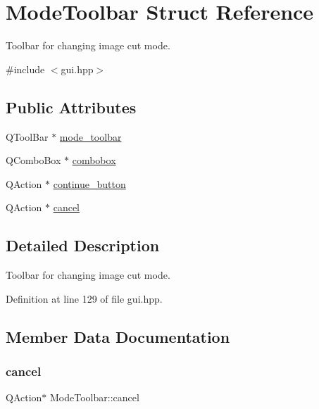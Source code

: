 \hypertarget{structModeToolbar}{}\section{Mode\+Toolbar Struct Reference}
\label{structModeToolbar}


Toolbar for changing image cut mode.  




{\ttfamily \#include $<$gui.\+hpp$>$}

\subsection*{Public Attributes}
\begin{DoxyCompactItemize}
\item 
Q\+Tool\+Bar $\ast$ \mbox{\hyperlink{structModeToolbar_acc6bcdd91825343f34ec38d312418234}{mode\+\_\+toolbar}}
\item 
Q\+Combo\+Box $\ast$ \mbox{\hyperlink{structModeToolbar_ad0ba4f03ef2a44e2543add404a50b4f1}{combobox}}
\item 
Q\+Action $\ast$ \mbox{\hyperlink{structModeToolbar_af7d7766f5b1710abb382c42689e963ca}{continue\+\_\+button}}
\item 
Q\+Action $\ast$ \mbox{\hyperlink{structModeToolbar_a814fa4aec4ff40543904dfc4aa4c8e89}{cancel}}
\end{DoxyCompactItemize}


\subsection{Detailed Description}
Toolbar for changing image cut mode. 

Definition at line 129 of file gui.\+hpp.



\subsection{Member Data Documentation}
\mbox{\label{structModeToolbar_a814fa4aec4ff40543904dfc4aa4c8e89}} 
\subsubsection{\texorpdfstring{cancel}{cancel}}
{\footnotesize\ttfamily Q\+Action$\ast$ Mode\+Toolbar\+::cancel}


